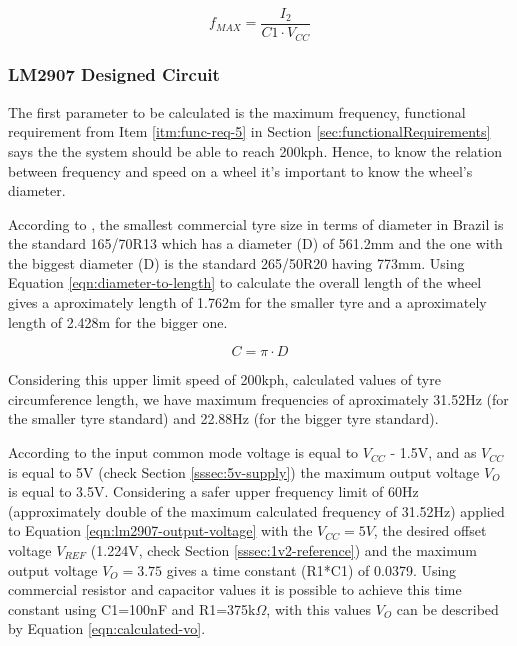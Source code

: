 			\begin{equation}\label{eqn:lm2907-max-freq}
				f_{MAX} = \frac{I_{2}}{C1 \cdot V_{CC}}
			\end{equation}

		\subsubsection{LM2907 Designed Circuit}\label{sssec:lm2907-designed-circuit}

			The first parameter to be calculated is the maximum frequency, functional requirement from Item \ref{itm:func-req-5} in Section \ref{sec:functionalRequirements} says the the system should be able to reach 200kph. Hence, to know the relation between frequency and speed on a wheel it's important to know the wheel's diameter.
			\par
			According to \cite{pneus-facil-todas-as-medidas-de-pneu}, the smallest commercial tyre size in terms of diameter in Brazil is the standard 165/70R13 which has a diameter (D) of 561.2mm and the one with the biggest diameter (D) is the standard 265/50R20 having 773mm. Using Equation \ref{eqn:diameter-to-length} to calculate the overall length of the wheel gives a aproximately length of 1.762m for the smaller tyre and a aproximately length of 2.428m for the bigger one.

			\begin{equation}\label{eqn:diameter-to-length}
				C = \pi \cdot D
			\end{equation}

			Considering this upper limit speed of 200kph, calculated values of tyre circumference length, we have maximum frequencies of aproximately 31.52Hz (for the smaller tyre standard) and 22.88Hz (for the bigger tyre standard). 
			\par
			According to \cite{lm2907-datasheet} the input common mode voltage is equal to $V_{CC}$ - 1.5V, and as $V_{CC}$ is equal to 5V (check Section \ref{sssec:5v-supply}) the maximum output voltage $V_{O}$ is equal to 3.5V. Considering a safer upper frequency limit of 60Hz (approximately double of the maximum calculated frequency of 31.52Hz) applied to Equation \ref{eqn:lm2907-output-voltage} with the $V_{CC}=5V$, the desired offset voltage $V_{REF}$ (1.224V, check Section \ref{sssec:1v2-reference}) and the maximum output voltage $V_{O}=3.75$ gives a time constant (R1*C1) of 0.0379. Using commercial resistor and capacitor values it is possible to achieve this time constant using C1=100nF and R1=375k$\Omega$, with this values $V_{O}$ can be described by Equation \ref{eqn:calculated-vo}.

